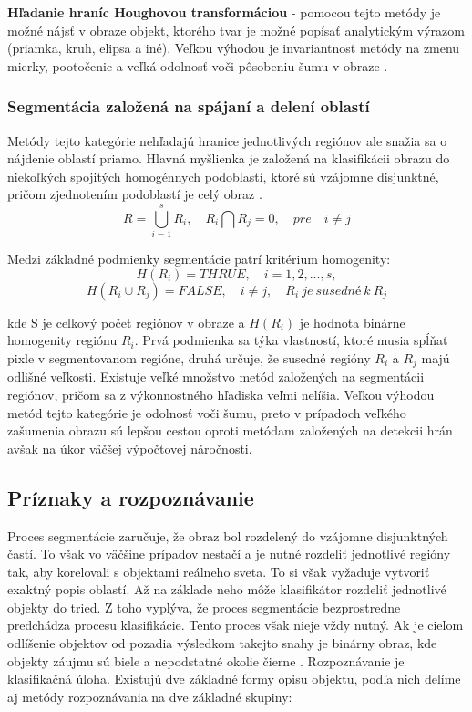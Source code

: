 \textbf{Hľadanie hraníc Houghovou transformáciou} - pomocou tejto metódy je možné nájsť v obraze objekt, ktorého tvar je možné popísať analytickým výrazom (priamka, kruh, elipsa a iné). Veľkou výhodou je invariantnosť metódy na zmenu mierky, pootočenie a veľká odolnosť voči pôsobeniu šumu v obraze \cite{houghova_transformacia}. 

\subsubsection{Segmentácia založená na spájaní a delení oblastí}
Metódy tejto kategórie nehľadajú hranice jednotlivých regiónov ale snažia sa o nájdenie oblastí priamo. Hlavná myšlienka je založená na klasifikácii obrazu do niekoľkých spojitých homogénnych podoblastí, ktoré sú vzájomne disjunktné, pričom zjednotením podoblastí je celý obraz \cite{pocitacove_videnie_v_praxi}.
$$R=\bigcup_{i=1}^s R_i{,}\quad R_i\bigcap R_j=0{,}\quad{pre}\quad i\neq j$$

Medzi základné podmienky segmentácie patrí kritérium homogenity:
$$H(R_i)={THRUE}{,}\quad \textit{i}=1{,}2{,}{...}{,}s{,}$$
$$H(R_i \cup R_j)={FALSE}{,}\quad \textit{i} \neq \textit{j}{,}\quad R_i { \ je \ susedné \ k \ } R_j $$

kde S je celkový počet regiónov v obraze a $H(R_i)$ je hodnota binárne homogenity regiónu $R_i$. Prvá podmienka sa týka vlastností, ktoré musia spĺňať pixle v segmentovanom regióne, druhá určuje, že susedné regióny $R_i$ a $R_j$ majú odlišné veľkosti. Existuje veľké množstvo metód založených na segmentácii regiónov, pričom sa z výkonnostného hľadiska veľmi nelíšia. Veľkou výhodou metód tejto kategórie je odolnosť voči šumu, preto v prípadoch veľkého zašumenia obrazu sú lepšou cestou oproti metódam založených na detekcii hrán avšak na úkor väčšej výpočtovej náročnosti.  

\subsection{Príznaky a rozpoznávanie}
Proces segmentácie zaručuje, že obraz bol rozdelený do vzájomne disjunktných častí. To však vo väčšine prípadov nestačí a je nutné rozdeliť jednotlivé regióny tak, aby korelovali s objektami reálneho sveta. To si však vyžaduje vytvoriť exaktný popis oblastí. Až na základe neho môže klasifikátor rozdeliť jednotlivé objekty do tried.  Z toho vyplýva, že proces segmentácie bezprostredne predchádza procesu klasifikácie.  Tento proces však nieje vždy nutný. Ak je cieľom odlíšenie objektov od pozadia výsledkom takejto snahy je binárny obraz, kde objekty záujmu sú biele a nepodstatné okolie čierne \cite{Analysis_and_Machine_Vision}.
Rozpoznávanie je klasifikačná úloha. Existujú dve základné formy opisu objektu, podľa nich delíme aj metódy rozpoznávania na dve základné skupiny: 

